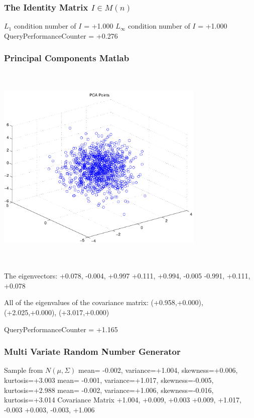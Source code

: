 \documentclass[9pt]{article}
\theoremstyle{plain}
\theoremstyle{definition}
\theoremstyle{remark}
\numberwithin{equation}{section}
\begin{document}
\subsubsection{The Identity Matrix $I \in M(n)$}
$L_1$ condition number of $I$ = +1.000
$L_\infty$ condition number of $I$ = +1.000
QueryPerformanceCounter  =  +0.276
\subsubsection{Principal Components Matlab }
\includegraphics[width=10.0cm,height=10.0cm]{PCAPoints.pdf}

The eigenvectors:
+0.078, -0.004, +0.997
+0.111, +0.994, -0.005
-0.991, +0.111, +0.078

All of the eigenvalues of the covariance matrix:
(+0.958,+0.000), (+2.025,+0.000), (+3.017,+0.000)

QueryPerformanceCounter  =  +1.165
\subsubsection{Multi Variate Random Number Generator }
Sample from $N(\mu,\Sigma)$
mean= -0.002, variance=+1.004, skewness=+0.006, kurtosis=+3.003
mean= -0.001, variance=+1.017, skewness=-0.005, kurtosis=+2.988
mean= -0.002, variance=+1.006, skewness=-0.016, kurtosis=+3.014
Covariance Matrix 
+1.004, +0.009, +0.003
+0.009, +1.017, -0.003
+0.003, -0.003, +1.006
\end{document}
